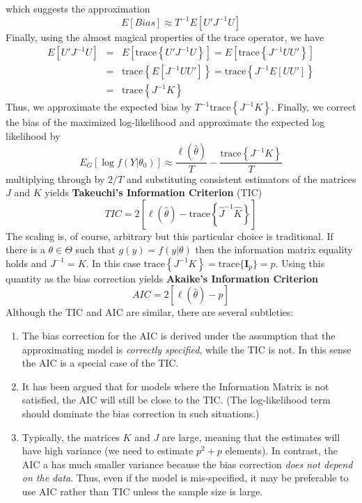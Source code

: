 \documentclass[12pt]{article}
\theoremstyle{definition}
\begin{document}
which suggests the approximation
	$$E[Bias] \approx T^{-1} E[U'J^{-1}U]$$
Finally, using the almost magical properties of the trace operator, we have
	\begin{eqnarray*}
		E[U'J^{-1}U] &=& E\left[\mbox{trace} \left\{ U'J^{-1}U\right\} \right] = E\left[\mbox{trace} \left\{ J^{-1}UU'\right\} \right]\\
			&=& \mbox{trace}\left\{ E[J^{-1}UU']\right\} = \mbox{trace}\left\{J^{-1} E[UU']\right\} \\
			&=&\mbox{trace}\left\{ J^{-1} K\right\}
	\end{eqnarray*}
Thus, we approximate the expected bias by $T^{-1}\mbox{trace}\left\{ J^{-1} K\right\}$. Finally, we correct the bias of the maximized log-likelihood and approximate the expected log likelihood by
	$$E_G[\log f(Y|\theta_0)]\approx \frac{\ell(\widehat{\theta})}{T} - \frac{\mbox{trace}\left\{ J^{-1} K\right\}}{T}$$
multiplying through by $2/T$ and substituting consistent estimators of the matrices $J$ and $K$ yields \textbf{Takeuchi's Information Criterion} (TIC)
	$$TIC = 2\left[\ell(\widehat{\theta}) - \mbox{trace}\left\{ \widehat{J}^{-1} \widehat{K}\right\} \right]$$
The scaling is, of course, arbitrary but this particular choice is traditional. If there is a $\theta \in \Theta$ such that $g(y) = f(y|\theta)$ then the information matrix equality holds and $J^{-1} = K$. In this case $\mbox{trace}\left\{ J^{-1} K\right\} = \mbox{trace}\{\mathbf{I}_p\} = p$. Using this quantity as the bias correction yields \textbf{Akaike's Information Criterion}
	$$AIC = 2 \left[\ell(\widehat{\theta}) - p \right]$$
Although the TIC and AIC are similar, there are several subtleties:
	\begin{enumerate}
		\item The bias correction for the AIC is derived under the assumption that the approximating model is \emph{correctly specified}, while the TIC is not. In this sense the AIC is a special case of the TIC.
		\item It has been argued that for models where the Information Matrix is not satisfied, the AIC will still be close to the TIC. (The log-likelihood term should dominate the bias correction in such situations.)
		\item Typically, the matrices $K$ and $J$ are large, meaning that the estimates will have high variance (we need to estimate $p^2 + p$ elements). In contrast, the AIC a has much smaller variance because the bias correction \emph{does not depend on the data}. Thus, even if the model is mis-specified, it may be preferable to use AIC rather than TIC unless the sample size is large.
	\end{enumerate}
\end{document}
